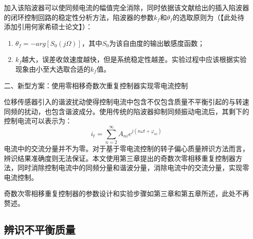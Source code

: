 \documentclass[
  lang=cn,
  degree=master,
  openany,oneside
]{nuaathesis}
\begin{document}
加入该陷波器可以使同频电流的幅值完全消除，同时依据该文献给出的插入陷波器的闭环控制回路的稳定性分析方法，陷波器的参数$k_f$和$\theta _f$的选取原则为（【此处待添加引用何家希硕士论文】）：
\begin{enumerate}
	\item $\theta _f = - arg\left[ S_0(j\Omega) \right]$，其中$S_0$为该自由度的输出敏感度函数；
	\item $k_f$越大，误差收敛速度越快，但是系统稳定性越差。实验过程中应该根据实验现象由小至大选取合适的$k_f$值。
\end{enumerate}


二、新型方案：使用零相移奇数次重复控制器实现零电流控制

位移传感器引入的谐波扰动使得控制电流中包含不仅包含质量不平衡引起的与转速同频的扰动，也包含谐波成分。使用传统的陷波器抑制同频振动电流后，其剩下的控制电流可以表示为：
\begin{equation}
	\label{eq:iz_0i_h}
	{i_t} = \sum\limits_{n = 2}^\infty  {{A_{ni}}{e^{j(n\omega t + {\varphi _{ni}})}}} 
\end{equation}
电流中的交流分量并不为零。对于基于零电流控制的转子偏心质量辨识方法而言，辨识结果准确度则无法保证。本文使用第三章提出的奇数次零相移重复控制器方法，同时消除控制电流中的同频分量和谐波分量，消除电流中的交流分量，实现零电流控制。

奇数次零相移重复控制器的参数设计和实验步骤如第三章和第五章所述，此处不再赘述。

\subsection{辨识不平衡质量}
\end{document}
